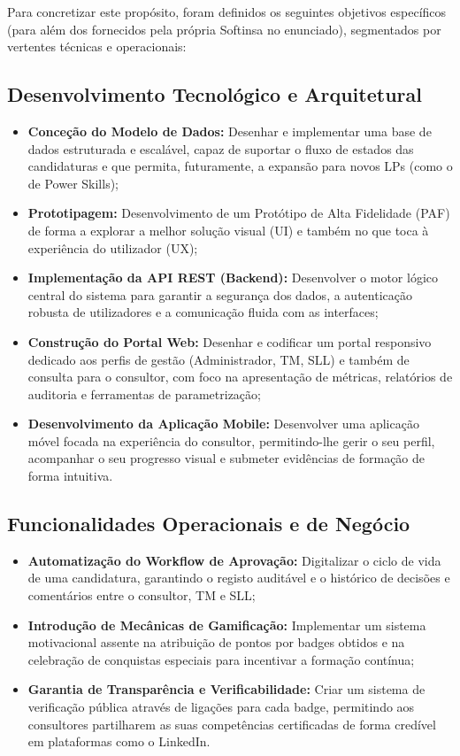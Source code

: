 \documentclass[12pt,a4paper]{report}
\begin{document}
Para concretizar este propósito, foram definidos os seguintes objetivos específicos (para além dos fornecidos pela própria Softinsa no enunciado), segmentados por vertentes técnicas e operacionais:

\subsection{Desenvolvimento Tecnológico e Arquitetural}

\begin{itemize}
  \item \textbf{Conceção do Modelo de Dados:} Desenhar e implementar uma base de dados estruturada e escalável, capaz de suportar o fluxo de estados das candidaturas e que permita, futuramente, a expansão para novos LPs (como o de Power Skills);
  \item \textbf{Prototipagem:} Desenvolvimento de um Protótipo de Alta Fidelidade (PAF) de forma a explorar a melhor solução visual (UI) e também no que toca à experiência do utilizador (UX);
  \item \textbf{Implementação da API REST (Backend):} Desenvolver o motor lógico central do sistema para garantir a segurança dos dados, a autenticação robusta de utilizadores e a comunicação fluida com as interfaces;
  \item \textbf{Construção do Portal Web:} Desenhar e codificar um portal responsivo dedicado aos perfis de gestão (Administrador, TM, SLL) e também de consulta para o consultor, com foco na apresentação de métricas, relatórios de auditoria e ferramentas de parametrização;
  \item \textbf{Desenvolvimento da Aplicação Mobile:} Desenvolver uma aplicação móvel focada na experiência do consultor, permitindo-lhe gerir o seu perfil, acompanhar o seu progresso visual e submeter evidências de formação de forma intuitiva.
\end{itemize}

\subsection{Funcionalidades Operacionais e de Negócio}

\begin{itemize}
  \item \textbf{Automatização do Workflow de Aprovação:} Digitalizar o ciclo de vida de uma candidatura, garantindo o registo auditável e o histórico de decisões e comentários entre o consultor, TM e SLL;
  \item \textbf{Introdução de Mecânicas de Gamificação:} Implementar um sistema motivacional assente na atribuição de pontos por badges obtidos e na celebração de conquistas especiais para incentivar a formação contínua;
  \item \textbf{Garantia de Transparência e Verificabilidade:} Criar um sistema de verificação pública através de ligações para cada badge, permitindo aos consultores partilharem as suas competências certificadas de forma credível em plataformas como o LinkedIn.
\end{itemize}
\end{document}
